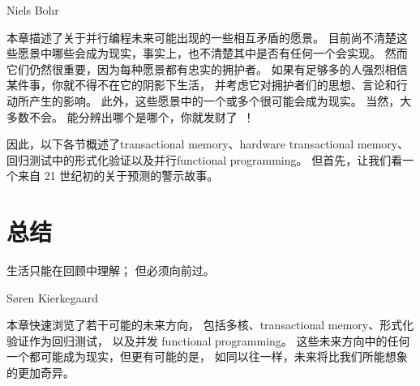 
%
	 {Niels Bohr}

本章描述了关于并行编程未来可能出现的一些相互矛盾的愿景。
目前尚不清楚这些愿景中哪些会成为现实，事实上，也不清楚其中是否有任何一个会实现。
然而它们仍然很重要，因为每种愿景都有忠实的拥护者。
如果有足够多的人强烈相信某件事，你就不得不在它的阴影下生活，
并考虑它对拥护者们的思想、言论和行动所产生的影响。
此外，这些愿景中的一个或多个很可能会成为现实。
当然，大多数不会。
能分辨出哪个是哪个，你就发财了~\cite{KeithRSpitz1977}！

因此，以下各节概述了transactional memory、hardware transactional memory、
回归测试中的形式化验证以及并行functional programming。
但首先，让我们看一个来自 21 世纪初的关于预测的警示故事。


\IfTwoColumn{}{\FloatBarrier}

\IfTwoColumn{}{\FloatBarrier}




\section{总结}
\label{sec:future:Summary}
%
\epigraph{生活只能在回顾中理解；
	   但必须向前过。}
	  {S{\o}ren Kierkegaard}

本章快速浏览了若干可能的未来方向，
包括多核、transactional memory、形式化验证作为回归测试，
以及并发 functional programming。
这些未来方向中的任何一个都可能成为现实，但更有可能的是，
如同以往一样，未来将比我们所能想象的更加奇异。

